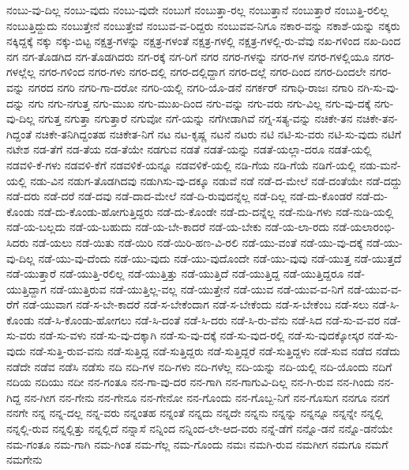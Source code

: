 {ನಂಬು-ವು-ದಿಲ್ಲ
ನಂಬು-ವುದು
ನಂಬು-ವುದೇ
ನಂಬುಗೆ
ನಂಬುತ್ತಾ-ರಲ್ಲ
ನಂಬುತ್ತಾನೆ
ನಂಬುತ್ತಾರೆ
ನಂಬುತ್ತಿ-ರಲಿಲ್ಲ
ನಂಬುತ್ತಿದ್ದುದು
ನಂಬುತ್ತೇನೆ
ನಂಬುತ್ತೇವೆ
ನಂಬುವ-ವ-ರಿದ್ದರು
ನಂಬುವವ-ನಿಗೂ
ನಕಾರ-ವನ್ನು
ನಕಾಶೆ-ಯನ್ನು
ನಕ್ಕರು
ನಕ್ಕಿದ್ದಕ್ಕೆ
ನಕ್ಕು
ನಕ್ಕು-ಬಿಟ್ಟ
ನಕ್ಷತ್ರ-ಗಳನ್ನು
ನಕ್ಷತ್ರ-ಗಳಂತೆ
ನಕ್ಷತ್ರ-ಗಳಲ್ಲಿ
ನಕ್ಷತ್ರ-ಗಳಲ್ಲಿ-ರು-ವೆವು
ನಖ-ಗಳಿಂದ
ನಖ-ದಿಂದ
ನಗ
ನಗ-ತೊಡಗಿದ
ನಗ-ತೊಡಗಿದರು
ನಗ-ರಕ್ಕೆ
ನಗ-ರಿಗೆ
ನಗರ
ನಗರ-ಗಳನ್ನು
ನಗರ-ಗಳ
ನಗರ-ಗಳಲ್ಲಿಯೂ
ನಗರ-ಗಳಲ್ಲೆಲ್ಲ
ನಗರ-ಗಳಿಂದ
ನಗರ-ಗಳು
ನಗರ-ದಲ್ಲಿ
ನಗರ-ದಲ್ಲಿದ್ದಾಗ
ನಗರ-ದಲ್ಲೆ
ನಗರ-ದಿಂದ
ನಗರ-ದಿಂದಲೇ
ನಗರ-ವನ್ನು
ನಗರದ
ನಗರಿ
ನಗರಿ-ಗಾ-ದರೋ
ನಗರಿ-ಯಲ್ಲಿ
ನಗರಿ-ಯೊ-ಡನೆ
ನಗರ್ಕರ್
ನಗಾಧಿ-ರಾಜಃ
ನಗಾರಿ
ನಗಿ-ಸು-ವು-ದನ್ನು
ನಗು
ನಗು-ನಗುತ್ತ
ನಗು-ಮುಖ
ನಗು-ಮುಖ-ದಿಂದ
ನಗು-ವನ್ನು
ನಗು-ವರು
ನಗು-ವಿಲ್ಲ
ನಗು-ವು-ದಕ್ಕೆ
ನಗು-ವು-ದಿಲ್ಲ
ನಗುತ್ತ
ನಗುತ್ತಾ
ನಗುತ್ತಾರೆ
ನಗುವೋ
ನಗೆ-ಯನ್ನು
ನಗೆಗೀಡಾಗಿವೆ
ನಗ್ನ-ಸತ್ಯ-ವನ್ನು
ನಚಿಕೇ-ತನ
ನಚಿಕೇ-ತನ-ಗಿದ್ದಂತೆ
ನಚಿಕೇ-ತನಿಗಿದ್ದಂತಹ
ನಚಿಕೇತ-ನಿಗೆ
ನಟ
ನಟ-ಕೃಷ್ಣ
ನಟನೆ
ನಟರು
ನಟಿ
ನಟಿ-ಸು-ವರು
ನಟಿ-ಸು-ವುದು
ನಟಿಗೆ
ನಟೇಶ
ನಡ-ತೆಗೆ
ನಡ-ತೆಯ
ನಡ-ತೆಯೇ
ನಡಗುವ
ನಡತೆ
ನಡತೆ-ಯನ್ನು
ನಡತೆ-ಯಲ್ಲಾ-ದರೂ
ನಡತೆ-ಯಲ್ಲಿ
ನಡವಳಿ-ಕೆ-ಗಳು
ನಡವಳಿ-ಕೆಗೆ
ನಡವಳಿಕೆ-ಯನ್ನೂ
ನಡವಳಿಕೆ-ಯಲ್ಲಿ
ನಡಿ-ಗೆಯ
ನಡಿ-ಗೆಯೆ
ನಡಿಗೆ-ಯಲ್ಲಿ
ನಡು-ಮನೆ-ಯಲ್ಲಿ
ನಡು-ವಿನ
ನಡುಗ-ತೊಡಗಿದವು
ನಡುಗಿಸು-ವು-ದಕ್ಕೂ
ನಡುವೆ
ನಡೆ
ನಡೆ-ದ-ಮೇಲೆ
ನಡೆ-ದಂತೆಯೇ
ನಡೆ-ದದ್ದು
ನಡೆ-ದರು
ನಡೆ-ದರೆ
ನಡೆ-ದವು
ನಡೆ-ದಾದ-ಮೇಲೆ
ನಡೆ-ದಿ-ರುವುದನ್ನೆಲ್ಲ
ನಡೆ-ದಿಲ್ಲ
ನಡೆ-ದು-ಕೊಂಡರೆ
ನಡೆ-ದು-ಕೊಂಡು
ನಡೆ-ದು-ಕೊಂಡು-ಹೋಗುತ್ತಿದ್ದರು
ನಡೆ-ದು-ಕೊಂಡೇ
ನಡೆ-ದು-ದನ್ನೆಲ್ಲ
ನಡೆ-ನುಡಿ-ಗಳು
ನಡೆ-ನುಡಿ-ಯಲ್ಲಿ
ನಡೆ-ಯ-ಬಲ್ಲದು
ನಡೆ-ಯ-ಬಹುದು
ನಡೆ-ಯ-ಬೇ-ಕಾದರೆ
ನಡೆ-ಯ-ಬೇಕು
ನಡೆ-ಯ-ಲಾ-ರದು
ನಡೆ-ಯಲಾರಂಭಿ-ಸಿದರು
ನಡೆ-ಯಲು
ನಡೆ-ಯಿತು
ನಡೆ-ಯಿರಿ
ನಡೆ-ಯಿರಿ-ಹಣ-ವಿ-ರಲಿ
ನಡೆ-ಯು-ವಂತೆ
ನಡೆ-ಯು-ವು-ದಕ್ಕೆ
ನಡೆ-ಯು-ವು-ದಿಲ್ಲ
ನಡೆ-ಯು-ವು-ದೆಂದು
ನಡೆ-ಯು-ವುದು
ನಡೆ-ಯು-ವುದೊಂದೇ
ನಡೆ-ಯು-ವುವು
ನಡೆ-ಯುತ್ತ
ನಡೆ-ಯುತ್ತದೆ
ನಡೆ-ಯುತ್ತಾರೆ
ನಡೆ-ಯುತ್ತಿ-ರಲಿಲ್ಲ
ನಡೆ-ಯುತ್ತಿತ್ತು
ನಡೆ-ಯುತ್ತಿದೆ
ನಡೆ-ಯುತ್ತಿದ್ದ
ನಡೆ-ಯುತ್ತಿದ್ದರೂ
ನಡೆ-ಯುತ್ತಿದ್ದಾಗ
ನಡೆ-ಯುತ್ತಿರುವ
ನಡೆ-ಯುತ್ತಿಲ್ಲ-ವಲ್ಲ
ನಡೆ-ಯುತ್ತೇನೆ
ನಡೆ-ಯುವ
ನಡೆ-ಯುವ-ವ-ನಿಗೆ
ನಡೆ-ಯುವ-ವ-ರೆಗೆ
ನಡೆ-ಯುವಾಗ
ನಡೆ-ಸ-ಬೇ-ಕಾದರೆ
ನಡೆ-ಸ-ಬೇಕೆಂದಾಗ
ನಡೆ-ಸ-ಬೇಕೆಂದು
ನಡೆ-ಸ-ಬೇಕೆಂಬ
ನಡೆ-ಸಲು
ನಡೆ-ಸಿ-ಕೊಂಡು
ನಡೆ-ಸಿ-ಕೊಂಡು-ಹೋಗಲು
ನಡೆ-ಸಿ-ದಂತೆ
ನಡೆ-ಸಿ-ದರು
ನಡೆ-ಸಿ-ರು-ವೆನು
ನಡೆ-ಸಿದ
ನಡೆ-ಸು-ವ-ವರ
ನಡೆ-ಸು-ವರು
ನಡೆ-ಸು-ವಳು
ನಡೆ-ಸು-ವು-ದಕ್ಕಾಗಿ
ನಡೆ-ಸು-ವು-ದಕ್ಕೆ
ನಡೆ-ಸು-ವುದ-ರಲ್ಲಿ
ನಡೆ-ಸು-ವುದಕ್ಕೋಸ್ಕರ
ನಡೆ-ಸು-ವುದು
ನಡೆ-ಸುತ್ತಿ-ರುವ-ವನು
ನಡೆ-ಸುತ್ತಿದ್ದ
ನಡೆ-ಸುತ್ತಿದ್ದರು
ನಡೆ-ಸುತ್ತಿದ್ದರೆ
ನಡೆ-ಸುತ್ತಿದ್ದಳು
ನಡೆ-ಸುವ
ನಡೆದ
ನಡೆದು
ನಡೆದೇ
ನಡೆವ
ನಡೆಸಿ
ನಡೆಸು
ನದಿ
ನದಿ-ಗಳ
ನದಿ-ಗಳು
ನದಿ-ಗಳೆಲ್ಲ
ನದಿ-ಯನ್ನು
ನದಿ-ಯಲ್ಲಿ
ನದಿ-ಯೊಂದು
ನದಿಗೆ
ನದಿಯ
ನದಿಯು
ನದೀ
ನನ-ಗಂತೂ
ನನ-ಗಾ-ವು-ದರ
ನನ-ಗಾಗಿ
ನನ-ಗಾಗುವಿ-ದಿಲ್ಲ
ನನ-ಗಿ-ರುವ
ನನ-ಗಿಂದು
ನನ-ಗಿದ್ದ
ನನ-ಗೀಗ
ನನ-ಗೇನು
ನನ-ಗೇನೂ
ನನ-ಗೇನೋ
ನನ-ಗೊಂದು
ನನ-ಗೊಬ್ಬ-ನಿಗೆ
ನನ-ಗೊಸುಗ
ನನಗೂ
ನನಗೆ
ನನಗೇ
ನನ್ನ
ನನ್ನ-ದಲ್ಲ
ನನ್ನ-ವರು
ನನ್ನಂತಹ
ನನ್ನಂತೆ
ನನ್ನದು
ನನ್ನದೇ
ನನ್ನನು
ನನ್ನನ್ನು
ನನ್ನನ್ನೂ
ನನ್ನನ್ನೇ
ನನ್ನಲ್ಲಿ
ನನ್ನಲ್ಲಿ-ರುವ
ನನ್ನಲ್ಲಿತ್ತು
ನನ್ನಲ್ಲಿದೆ
ನನ್ನಾಸೆ
ನನ್ನಿಂದ
ನನ್ನಿಂದ-ಲೇ-ಆದ-ವರು
ನನ್ನೆ-ಡೆಗೆ
ನನ್ನೊ-ಡನೆ
ನನ್ನೊ-ಡನೆಯೇ
ನಮ-ಗಂತೂ
ನಮ-ಗಾಗಿ
ನಮ-ಗಿಂತ
ನಮ-ಗೆಲ್ಲ
ನಮ-ಗೊಂದು
ನಮಃ
ನಮಗಿ-ರುವ
ನಮಗೀಗ
ನಮಗೂ
ನಮಗೆ
ನಮಗೇನು
}
